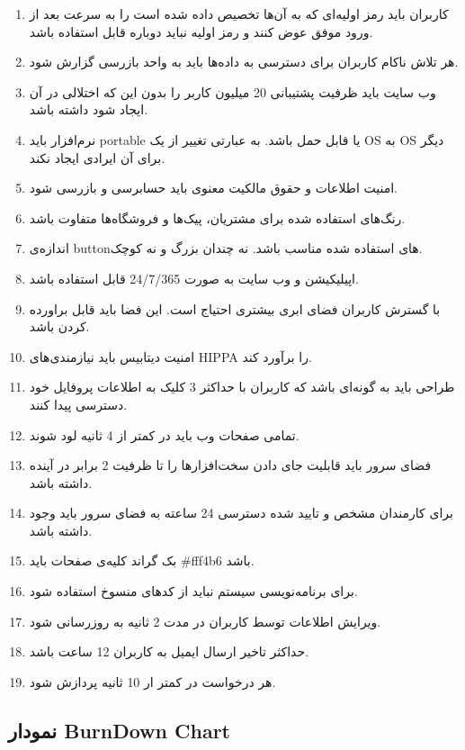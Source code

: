 \documentclass[]{article}
\begin{document}
\begin{enumerate}
\def\labelenumi{\arabic{enumi})}
\item
  کاربران باید رمز اولیه‌ای که به آن‌ها تخصیص داده شده است را به سرعت
  بعد از ورود موفق عوض کنند و رمز اولیه نباید دوباره قابل استفاده باشد.
\item
  هر تلاش ناکام کاربران برای دسترسی به داده‌ها باید به واحد بازرسی گزارش
  شود.
\item
  وب سایت باید ظرفیت پشتیبانی 20 میلیون کاربر را بدون این که اختلالی در
  آن ایجاد شود داشته باشد.
\item
  نرم‌افزار باید portable یا قابل حمل باشد. به عبارتی تغییر از یک OS به
  OS دیگر برای آن ایرادی ایجاد نکند.
\item
  امنیت اطلاعات و حقوق مالکیت معنوی باید حسابرسی و بازرسی شود.
\item
  رنگ‌های استفاده شده برای مشتریان، پیک‌ها و فروشگاه‌ها متفاوت باشد.
\item
  اندازه‌ی buttonهای استفاده شده مناسب باشد. نه چندان بزرگ و نه کوچک.
\item
  اپیلیکیشن و وب سایت به صورت 24/7/365 قابل استفاده باشد.
\item
  با گسترش کاربران فضای ابری بیشتری احتیاج است. این فضا باید قابل
  براورده کردن باشد.
\item
  امنیت دیتابیس باید نیازمندی‌های HIPPA را برآورد کند.
\item
  طراحی باید به گونه‌ای باشد که کاربران با حداکثر 3 کلیک به اطلاعات
  پروفایل خود دسترسی پیدا کنند.
\item
  تمامی صفحات وب باید در کمتر از 4 ثانیه لود شوند.
\item
  فضای سرور باید قابلیت جای دادن سخت‌افزارها را تا ظرفیت 2 برابر در
  آینده داشته باشد.
\item
  برای کارمندان مشخص و تایید شده دسترسی 24 ساعته به فضای سرور باید وجود
  داشته باشد.
\item
  بک گراند کلیه‌ی صفحات باید \#fff4b6 باشد.
\item
  برای برنامه‌نویسی سیستم نباید از کدهای منسوخ استفاده شود.
\item
  ویرایش اطلاعات توسط کاربران در مدت 2 ثانیه به روزرسانی شود.
\item
  حداکثر تاخیر ارسال ایمیل به کاربران 12 ساعت باشد.
\item
  هر درخواست در کمتر ار 10 ثانیه پردازش شود.
\end{enumerate}

\subsection{نمودار BurnDown
Chart}\label{ux646ux645ux648ux62fux627ux631-burndown-chart}
\end{document}
